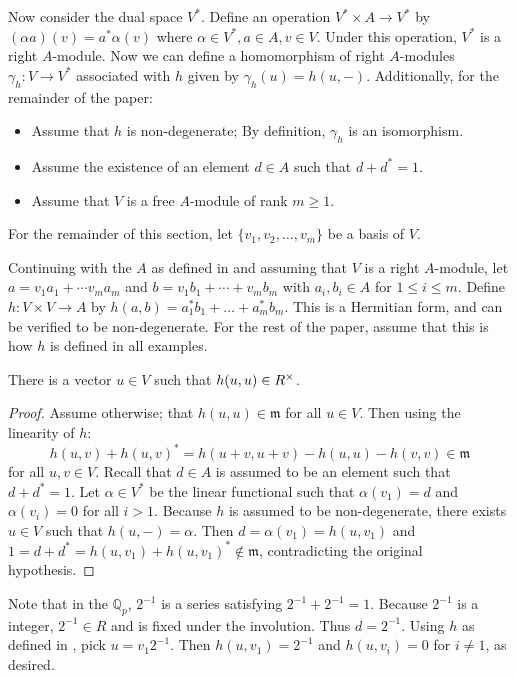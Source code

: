 Now consider the dual space $V^*$. Define an operation $V^* \times A \to V^*$ by $(\alpha a)(v) = a^* \alpha(v)$ where $\alpha \in V^*, a \in A, v \in V$.
Under this operation, $V^*$ is a right $A$-module.
Now we can define a homomorphism of right $A$-modules $\gamma_h: V \to V^*$ associated with $h$ given by $\gamma_h(u) = h(u, -)$.
Additionally, for the remainder of the paper:
\begin{itemize}
\item Assume that $h$ is non-degenerate; By definition, $\gamma_h$ is an isomorphism.
\item Assume the existence of an element $d \in A$ such that $d + d^* = 1$.
\item Assume that $V$ is a free $A$-module of rank $m \ge 1$.
\end{itemize}
For the remainder of this section, let $\{v_1, v_2, \dotsc, v_m\}$ be a basis of $V$.

\begin{example}\label{ex2.2}
Continuing with the $A$ as defined in  and assuming that $V$ is a right $A$-module,
let $a = v_1 a_1 + \dotsb v_m a_m$ and $b = v_1 b_1 + \dotsb + v_m b_m$ with $a_i, b_i \in A$ for $1 \le i \le m$.
Define $h: V \times V \to A$ by $h(a, b) = a_1^* b_1 + \dotsc + a_m^* b_m$.
This is a Hermitian form, and can be verified to be non-degenerate.
For the rest of the paper, assume that this is how $h$ is defined in all examples.
\end{example}

\begin{lemma}\label{lemma2.1}
There is a vector $u \in V$ such that $h(u,u) \in R^\times$.
\end{lemma}
\begin{proof}
Assume otherwise; that  $h(u,u) \in \mathfrak{m}$ for all $u \in V$.
Then using the linearity of $h$:
\[
h(u,v) + h(u,v)^* = h(u+v, u+v) - h(u,u) - h(v,v) \in \mathfrak{m}
\]
for all $u,v \in V$.
Recall that $d \in A$ is assumed to be an element such that $d + d^* = 1$.
Let $\alpha \in V^*$ be the linear functional such that $\alpha(v_1) = d$ and $\alpha(v_i) = 0$ for all $i > 1$.
Because $h$ is assumed to be non-degenerate, there exists $u \in V$ such that $h(u,-) = \alpha$.
Then $d = \alpha(v_1) = h(u,v_1)$ and $1 = d + d^* = h(u,v_1) + h(u,v_1)^* \not\in \mathfrak{m}$, contradicting the original hypothesis.
\end{proof}

\begin{example}
Note that in the $\mathbb{Q}_p$, $2^{-1}$ is a series satisfying $2^{-1} + 2^{-1} = 1$.
Because $2^{-1}$ is a \padic integer, $2^{-1} \in R$ and is fixed under the involution.
Thus $d = 2^{-1}$.
Using $h$ as defined in , pick $u = v_1 2^{-1}$.
Then $h(u, v_1) = 2^{-1}$ and $h(u, v_i) = 0$ for $i \ne 1$, as desired.
\end{example}

